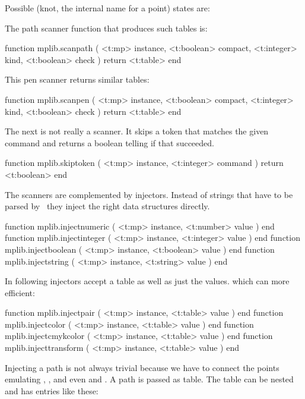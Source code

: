 Possible (knot, the internal name for a point) states are:

\startcolumns[n=4]
\stopcolumns

The path scanner function that produces such tables is:

\starttyping[option=LUA]
function mplib.scanpath (
    <t:mp>      instance,
    <t:boolean> compact,
    <t:integer> kind,
    <t:boolean> check
)
    return <t:table>
end
\stoptyping

This pen scanner returns similar tables:

\starttyping[option=LUA]
function mplib.scanpen (
    <t:mp>      instance,
    <t:boolean> compact,
    <t:integer> kind,
    <t:boolean> check
)
    return <t:table>
end
\stoptyping

The next is not really a scanner. It skips a token that matches the given command
and returns a boolean telling if that succeeded.

\starttyping[option=LUA]
function mplib.skiptoken ( <t:mp> instance, <t:integer> command )
    return <t:boolean>
end
\stoptyping

\stopsubsection

\startsubsection[title=Injectors]

The scanners are complemented by injectors. Instead of strings that have to be
parsed by \METAPOST\ they inject the right data structures directly.

\starttyping[option=LUA]
function mplib.injectnumeric ( <t:mp> instance, <t:number>  value ) end
function mplib.injectinteger ( <t:mp> instance, <t:integer> value ) end
function mplib.injectboolean ( <t:mp> instance, <t:boolean> value ) end
function mplib.injectstring  ( <t:mp> instance, <t:string>  value ) end
\stoptyping

In following injectors accept a table as well as just the values. which can more
efficient:

\starttyping[option=LUA]
function mplib.injectpair      ( <t:mp> instance, <t:table> value ) end
function mplib.injectcolor     ( <t:mp> instance, <t:table> value ) end
function mplib.injectcmykcolor ( <t:mp> instance, <t:table> value ) end
function mplib.injecttransform ( <t:mp> instance, <t:table> value ) end
\stoptyping

Injecting a path is not always trivial because we have to connect the points
emulating , , \type [option=MP]
{---} and even \type [option=MP] {&&} and . A path is
passed as table. The table can be nested and has entries like these:

